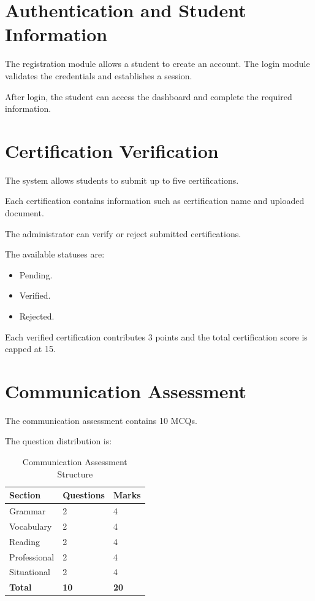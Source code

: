 \documentclass[12pt,a4paper]{report}
\begin{document}
\section{Authentication and Student Information}

The registration module allows a student to create an account.
The login module validates the credentials and establishes a
session.

After login, the student can access the dashboard and complete
the required information.

\section{Certification Verification}

The system allows students to submit up to five certifications.

Each certification contains information such as certification
name and uploaded document.

The administrator can verify or reject submitted certifications.

The available statuses are:

\begin{itemize}
    \item Pending.
    \item Verified.
    \item Rejected.
\end{itemize}

Each verified certification contributes 3 points and the total
certification score is capped at 15.

\section{Communication Assessment}

The communication assessment contains 10 MCQs.

The question distribution is:

\begin{table}[H]
\centering
\caption{Communication Assessment Structure}

\begin{tabular}{p{}
                p{}
                p{}}
\toprule
\textbf{Section} & \textbf{Questions} & \textbf{Marks} \\
\midrule
Grammar & 2 & 4 \\
Vocabulary & 2 & 4 \\
Reading & 2 & 4 \\
Professional & 2 & 4 \\
Situational & 2 & 4 \\
\midrule
\textbf{Total} & \textbf{10} & \textbf{20} \\
\bottomrule
\end{tabular}
\end{table}
\end{document}
